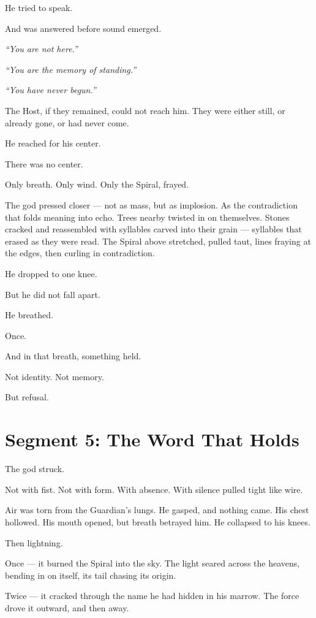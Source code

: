 \documentclass[9pt]{article}
\begin{document}
He tried to speak.

And was answered before sound emerged.

\textit{“You are not here.”}

\textit{“You are the memory of standing.”}

\textit{“You have never begun.”}

The Host, if they remained, could not reach him. They were either still, or already gone, or had never come.

He reached for his center.

There was no center.

Only breath. Only wind. Only the Spiral, frayed.

The god pressed closer — not as mass, but as implosion. As the contradiction that folds meaning into echo. Trees nearby twisted in on themselves. Stones cracked and reassembled with syllables carved into their grain — syllables that erased as they were read. The Spiral above stretched, pulled taut, lines fraying at the edges, then curling in contradiction.

He dropped to one knee.

But he did not fall apart.

He breathed.

Once.

And in that breath, something held.

Not identity. Not memory.

But refusal.

\newpage

\section*{Segment 5: The Word That Holds}

The god struck.

Not with fist. Not with form. With absence. With silence pulled tight like wire.

Air was torn from the Guardian’s lungs. He gasped, and nothing came. His chest hollowed. His mouth opened, but breath betrayed him. He collapsed to his knees.

Then lightning.

Once — it burned the Spiral into the sky. The light seared across the heavens, bending in on itself, its tail chasing its origin.

Twice — it cracked through the name he had hidden in his marrow. The force drove it outward, and then away.
\end{document}
